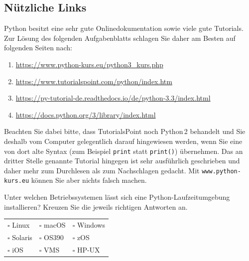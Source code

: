 \AufgabenHeader

\subsection*{Nützliche Links}
Python besitzt eine sehr gute Onlinedokumentation sowie viele gute Tutorials.
Zur Lösung des folgenden Aufgabenblatts schlagen Sie daher am Besten auf
folgenden Seiten nach:

\begin{enumerate}
    \item \url{https://www.python-kurs.eu/python3_kurs.php}
    \item \url{https://www.tutorialspoint.com/python/index.htm}
    \item \url{https://py-tutorial-de.readthedocs.io/de/python-3.3/index.html}
    \item \url{https://docs.python.org/3/library/index.html}
\end{enumerate}

Beachten Sie dabei bitte, dass TutorialsPoint noch Python\,2 behandelt und Sie
deshalb vom Computer gelegentlich darauf hingewiesen werden, wenn Sie eine von
dort alte Syntax (zum Beispiel \texttt{print} statt \texttt{print()}) übernehmen.
Das an dritter Stelle genannte Tutorial hingegen ist sehr ausführlich geschrieben
und daher mehr zum Durchlesen als zum Nachschlagen gedacht. Mit
\texttt{www.python-kurs.eu} können Sie aber nichts falsch machen.

\teilaufgabe
Unter welchen Betriebssystemen lässt sich eine Python-Laufzeitumgebung
installieren? Kreuzen Sie die jeweils richtigen Antworten an.

\begin{center}
    \begin{tabular}{p{}p{}p{}}
        $\square$ Linux &
        $\square$ macOS &
        $\square$ Windows \\

        $\square$ Solaris &
        $\square$ OS390 &
        $\square$ zOS \\

        $\square$ iOS &
        $\square$ VMS &
        $\square$ HP-UX \\
    \end{tabular}
\end{center}


